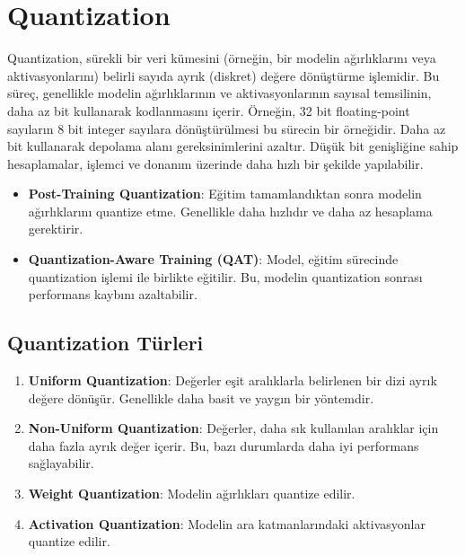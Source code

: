 \section{Quantization}

Quantization, sürekli bir veri kümesini (örneğin, bir modelin ağırlıklarını veya aktivasyonlarını) belirli sayıda ayrık (diskret) değere dönüştürme işlemidir. Bu süreç, genellikle modelin ağırlıklarının ve aktivasyonlarının sayısal temsilinin, daha az bit kullanarak kodlanmasını içerir. Örneğin, 32 bit floating-point sayıların 8 bit integer sayılara dönüştürülmesi bu sürecin bir örneğidir. Daha az bit kullanarak depolama alanı gereksinimlerini azaltır. Düşük bit genişliğine sahip hesaplamalar, işlemci ve donanım üzerinde daha hızlı bir şekilde yapılabilir. 

\begin{itemize}
    \item \textbf{Post-Training Quantization}: Eğitim tamamlandıktan sonra modelin ağırlıklarını quantize etme. Genellikle daha hızlıdır ve daha az hesaplama gerektirir.
    \item \textbf{Quantization-Aware Training (QAT)}: Model, eğitim sürecinde quantization işlemi ile birlikte eğitilir. Bu, modelin quantization sonrası performans kaybını azaltabilir.
\end{itemize}

\subsection{Quantization Türleri}

\begin{enumerate}
    \item \textbf{Uniform Quantization}: Değerler eşit aralıklarla belirlenen bir dizi ayrık değere dönüşür. Genellikle daha basit ve yaygın bir yöntemdir.
    \item \textbf{Non-Uniform Quantization}: Değerler, daha sık kullanılan aralıklar için daha fazla ayrık değer içerir. Bu, bazı durumlarda daha iyi performans sağlayabilir.
    \item \textbf{Weight Quantization}: Modelin ağırlıkları quantize edilir.
    \item \textbf{Activation Quantization}: Modelin ara katmanlarındaki aktivasyonlar quantize edilir.
\end{enumerate}

\newpage